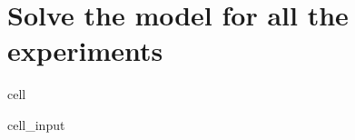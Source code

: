 \documentclass[letterpaper,10pt,english]{jupyterBook}
\begin{document}
\section{Solve the model for all the experiments}
\label{\detokenize{content/howto/optimization/Optimize_simpel:solve-the-model-for-all-the-experiments}}
\begin{sphinxuseclass}{cell}\begin{sphinxVerbatimInput}

\begin{sphinxuseclass}{cell_input}
\begin{sphinxVerbatim}[commandchars=\\\{\}]
            
\end{sphinxVerbatim}

\end{sphinxuseclass}\end{sphinxVerbatimInput}

\end{sphinxuseclass}
\end{document}
